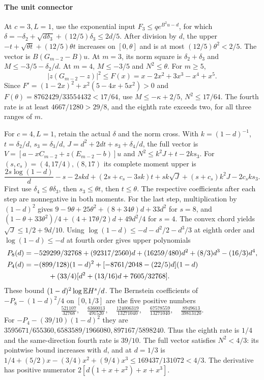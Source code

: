 \paragraph{The unit connector}\label{part:outer-unit:unit-connector}
At \(c=3,L=1\), use the exponential input
\(F_3\le qe^{B^2u-d}\), for which
\(\delta=-\delta_2+\sqrt{d\delta_3}+(12/5)\delta_3\le2d/5\).
After division by \(d\), the upper
\(-t+\sqrt{\theta t}+(12/5)\theta t\) increases on \([0,\theta]\)
and is at most \((12/5)\theta^2<2/5\).
The vector is \(B(G_{m-2}-B)u\).
At \(m=3\), its norm square is \(\delta_2+\delta_3\) and
\(M\le-3/5-\delta_2/d\). At \(m=4\), \(M\le-3/5\) and
\(N^2\le\theta\). For \(m\ge5\),
\[
 |z(G_{m-2}-z)|^2\le F(x)=x-2x^2+3x^3-x^4+x^5.
\]
Since \(F'=(1-2x)^2+x^2(5-4x+5x^2)>0\) and
\(F(\theta)=8762429/33554432<17/64\), use
\(M\le-\kappa+2/5\), \(N^2\le17/64\).
The fourth rate is at least \(4667/1280>29/8\), and the eighth rate
exceeds two, for all three ranges of \(m\).

For \(c=4,L=1\), retain the actual \(\delta\) and the norm cross.
With \(k=(1-d)^{-1}\), \(t=\delta_2/d\), \(s_3=\delta_3/d\),
\(J=d^2+2dt+s_3+\delta_4/d\), the full vector is
\(V=[a-xC_{m-2}+z(E_{m-2}-b)]u\) and
\(N^2\le k^2J+t-2ks_3\).
For \((s,c_s)=(4,17/4),(8,17)\) its complete moment upper is
\begin{equation}\label{eq:outer-unit:four-joint}
 \frac{2s\log(1-d)}d-s-2skd
 +(2s+c_s-3sk)t+sk\sqrt J+(s+c_s)k^2J-2c_sks_3.
\end{equation}
First use \(\delta_4\le\theta\delta_3\), then
\(s_3\le\theta t\), then \(t\le\theta\). The respective coefficients
after each step are nonnegative in both moments. For the last step,
multiplication by \((1-d)^2\) gives
\(9-9\theta+25\theta^2+(8+34\theta)d+33d^2\) for \(s=8\), and
\((1-\theta+33\theta^2)/4+(4+17\theta/2)d+49d^2/4\) for \(s=4\).
The convex chord yields \(\sqrt J\le1/2+9d/10\).
Using \(\log(1-d)\le-d-d^2/2-d^3/3\) at eighth order and
\(\log(1-d)\le-d\) at fourth order gives upper polynomials
\begin{equation}\label{eq:outer-unit:four-polynomials}
\begin{aligned}
 P_8(d)&=-529299/32768+(92317/2560)d+(16259/480)d^2
                         +(8/3)d^3-(16/3)d^4,\\
 P_4(d)&=-(899/128)(1-d)^2+[-8761/2048-(22/5)d](1-d)\\
       &\hspace{12mm}+(33/4)[d^2+(13/16)d+7605/32768].
\end{aligned}
\end{equation}
These bound \((1-d)^2\log\mathbb E H^s/d\).
The Bernstein coefficients of \(-P_8-(1-d)^2/4\) on \([0,1/3]\)
are the five positive numbers
\[
 \tfrac{521107}{32768},\quad\tfrac{6360013}{491520},\quad
 \tfrac{124006319}{13271040},\quad\tfrac{67578559}{13271040},\quad
 \tfrac{8949613}{39813120}.
\]
For \(-P_4-(39/10)(1-d)^2\) they are
\(3595671/655360,6583589/1966080,897167/5898240\).
Thus the eighth rate is \(1/4\) and the same-direction fourth rate is
\(39/10\). The full vector satisfies \(N^2<4/3\): its pointwise
bound increases with \(d\), and at \(d=1/3\) is
\(1/4+(5/2)x-(3/4)x^2+(9/4)x^3\le169437/131072<4/3\).
The derivative has positive numerator
\(2[d(1+x+x^2)+x+x^3]\).

